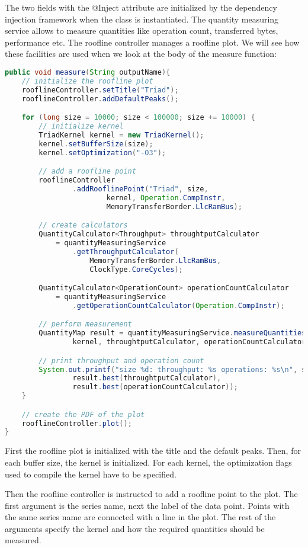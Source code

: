 \documentclass[a4paper,12pt]{report}
\begin{document}
The two fields with the @Inject attribute are initialized by the dependency
injection framework when the class is instantiated. The quantity measuring
service allows to measure quantities like operation count, transferred bytes,
performance etc. The roofline controller manages a roofline plot. We will see
how these facilities are used when we look at the body of the measure function:

\begin{lstlisting}[language=JAVA]
public void measure(String outputName){
	// initialize the roofline plot
	rooflineController.setTitle("Triad");
	rooflineController.addDefaultPeaks();

	for (long size = 10000; size < 100000; size += 10000) {
		// initialize kernel
		TriadKernel kernel = new TriadKernel();
		kernel.setBufferSize(size);
		kernel.setOptimization("-O3");

		// add a roofline point
		rooflineController
				.addRooflinePoint("Triad", size,
						kernel, Operation.CompInstr,
						MemoryTransferBorder.LlcRamBus);

		// create calculators
		QuantityCalculator<Throughput> throughtputCalculator 
			= quantityMeasuringService
				.getThroughputCalculator(
					MemoryTransferBorder.LlcRamBus,
					ClockType.CoreCycles);

		QuantityCalculator<OperationCount> operationCountCalculator 
			= quantityMeasuringService
				.getOperationCountCalculator(Operation.CompInstr);

		// perform measurement
		QuantityMap result = quantityMeasuringService.measureQuantities(
				kernel, throughtputCalculator, operationCountCalculator);

		// print throughput and operation count
		System.out.printf("size %d: throughput: %s operations: %s\n", size,
				result.best(throughtputCalculator),
				result.best(operationCountCalculator));
	}

	// create the PDF of the plot
	rooflineController.plot();
}
\end{lstlisting}

First the roofline plot is initialized with the title and the default peaks.
Then, for each buffer size, the kernel is initialized. For each kernel, the
optimization flags used to compile the kernel have to be specified.

Then the roofline controller is instructed to add a roofline point to the plot.
The first argument is the series name, next the label of the data point. Points
with the same series name are connected with a line in the plot. The rest of the
arguments specify the kernel and how the required quantities should be measured.
\end{document}
